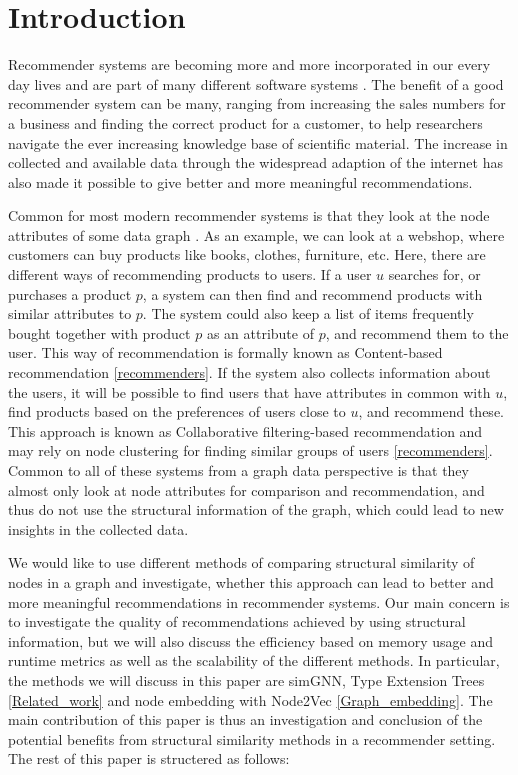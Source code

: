 \section{Introduction}
  Recommender systems are becoming more and more incorporated in our every day lives and are part of many different software systems \cite{recommender_e-comerce}. The benefit of a good recommender system can be many,  ranging from increasing the sales numbers for a business and finding the correct product for a customer, to help researchers navigate the ever increasing knowledge base of scientific material. The increase in collected and available data through the widespread adaption of the internet has also made it possible to give better and more meaningful recommendations.

  Common for most modern recommender systems is that they look at the node attributes of some data graph \cite{Ricci2015}. As an example, we can look at a webshop, where customers can buy products like books, clothes, furniture, etc. Here, there are different ways of recommending products to users. If a user $u$ searches for, or purchases a product $p$, a system can then find and recommend products with similar attributes to $p$. The system could also keep a list of items frequently bought together with product $p$ as an attribute of $p$, and recommend them to the user. This way of recommendation is formally known as Content-based recommendation \ref{recommenders}. If the system also collects information about the users, it will be possible to find users that have attributes in common with $u$, find products based on the preferences of users close to $u$, and recommend these. This approach is known as Collaborative filtering-based recommendation and may rely on node clustering for finding similar groups of users \ref{recommenders}. Common to all of these systems from a graph data perspective is that they almost only look at node attributes for comparison and recommendation, and thus do not use the structural information of the graph, which could lead to new insights in the collected data.

  We would like to use different methods of comparing structural similarity of nodes in a graph and investigate, whether this approach can lead to better and more meaningful recommendations in recommender systems. Our main concern is to investigate the quality of recommendations achieved by using structural information, but we will also discuss the efficiency based on memory usage and runtime metrics as well as the scalability of the different methods. In particular, the methods we will discuss in this paper are simGNN, Type Extension Trees \ref{Related_work} and node embedding with Node2Vec \ref{Graph_embedding}.
  The main contribution of this paper is thus an investigation and conclusion of the potential benefits from structural similarity methods in a recommender setting. The rest of this paper is structered as follows:
